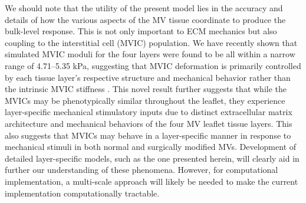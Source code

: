 We should note that the utility of the present model lies in the accuracy and details of how the various aspects of the MV tissue coordinate to produce the bulk-level response. This is not only important to ECM mechanics but also coupling to the interstitial cell (MVIC) population. We have recently shown that simulated MVIC moduli for the four layers were found to be all within a narrow range of 4.71–5.35 kPa, suggesting that MVIC deformation is primarily controlled by each tissue layer’s respective structure and mechanical behavior rather than the intrinsic MVIC stiffness \cite{lee_effects_2015}. This novel result further suggests that while the MVICs may be phenotypically similar throughout the leaflet, they experience layer-specific mechanical stimulatory inputs due to distinct extracellular matrix architecture and mechanical behaviors of the four MV leaflet tissue layers. This also suggests that MVICs may behave in a layer-specific manner in response to mechanical stimuli in both normal and surgically modified MVs. Development of detailed layer-specific models, such as the one presented herein, will clearly aid in further our understanding of these phenomena. However, for computational implementation, a multi-scale approach \cite{lee_mitral_2015} will likely be needed to make the current implementation computationally tractable.
